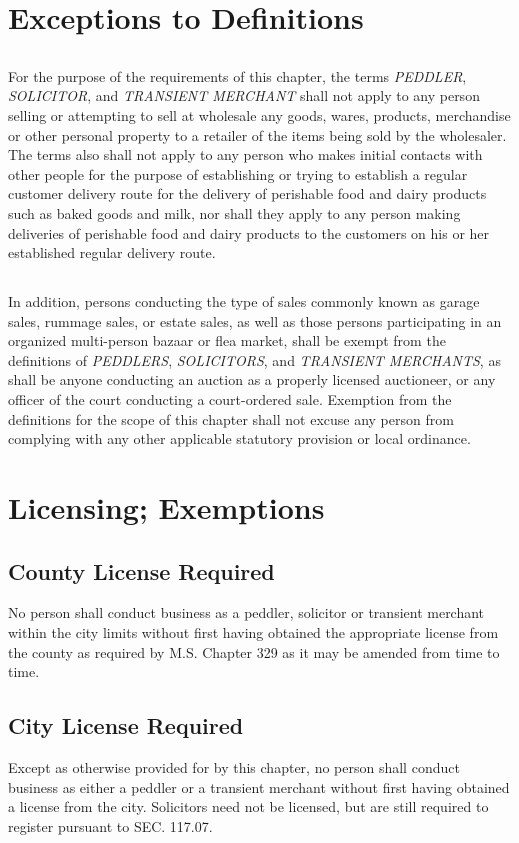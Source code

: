 \section{Exceptions to Definitions}
\subsection{}
For the purpose of the requirements of this chapter, the terms \emph{PEDDLER}, \emph{SOLICITOR}, and \emph{TRANSIENT MERCHANT} shall not apply to any person selling or attempting to sell at wholesale any goods, wares, products, merchandise or other personal property to a retailer of the items being sold by the wholesaler. The terms also shall not apply to any person who makes initial contacts with other people for the purpose of establishing or trying to establish a regular customer delivery route for the delivery of perishable food and dairy products such as baked goods and milk, nor shall they apply to any person making deliveries of perishable food and dairy products to the customers on his or her established regular delivery route.
\subsection{}
In addition, persons conducting the type of sales commonly known as garage sales, rummage sales, or estate sales, as well as those persons participating in an organized multi-person bazaar or flea market, shall be exempt from the definitions of \emph{PEDDLERS}, \emph{SOLICITORS}, and \emph{TRANSIENT MERCHANTS}, as shall be anyone conducting an auction as a properly licensed auctioneer, or any officer of the court conducting a court-ordered sale. Exemption from the definitions for the scope of this chapter shall not excuse any person from complying with any other applicable statutory provision or local ordinance.
\section{Licensing; Exemptions}
\subsection{County License Required}
No person shall conduct business as a peddler, solicitor or transient merchant within the city limits without first having obtained the appropriate license from the county as required by M.S. Chapter 329 as it may be amended from time to time.
\subsection{City License Required}
Except as otherwise provided for by this chapter, no person shall conduct business as either a peddler or a transient merchant without first having obtained a license from the city.  Solicitors need not be licensed, but are still required to register pursuant to SEC. 117.07.
